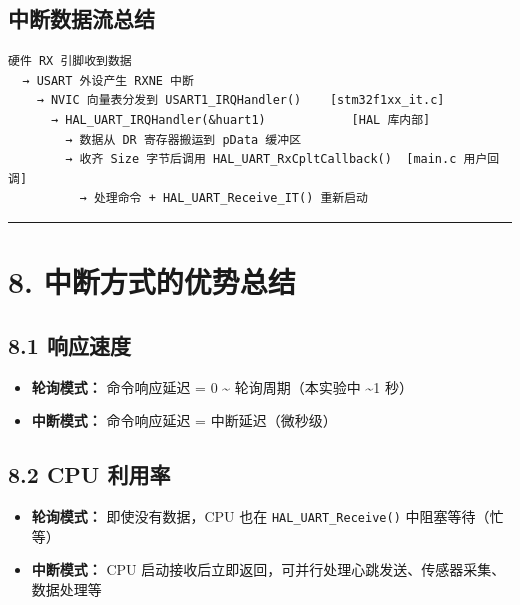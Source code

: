 \documentclass[
  chinese,
  UTF8,
  oneside,
  openany]{ctexbook}
\providecommand{\tightlist}{%
  \setlength{\itemsep}{0pt}\setlength{\parskip}{0pt}}
\begin{document}
\subsection{中断数据流总结}\label{ux4e2dux65adux6570ux636eux6d41ux603bux7ed3}

\begin{verbatim}
硬件 RX 引脚收到数据
  → USART 外设产生 RXNE 中断
    → NVIC 向量表分发到 USART1_IRQHandler()    [stm32f1xx_it.c]
      → HAL_UART_IRQHandler(&huart1)            [HAL 库内部]
        → 数据从 DR 寄存器搬运到 pData 缓冲区
        → 收齐 Size 字节后调用 HAL_UART_RxCpltCallback()  [main.c 用户回调]
          → 处理命令 + HAL_UART_Receive_IT() 重新启动
\end{verbatim}

\begin{center}\rule{0.5\linewidth}{0.5pt}\end{center}

\section{8.
中断方式的优势总结}\label{ux4e2dux65adux65b9ux5f0fux7684ux4f18ux52bfux603bux7ed3}

\subsection{8.1 响应速度}\label{ux54cdux5e94ux901fux5ea6}

\begin{itemize}
\tightlist
\item
  \textbf{轮询模式：} 命令响应延迟 = 0 \textasciitilde{}
  轮询周期（本实验中 \textasciitilde1 秒）
\item
  \textbf{中断模式：} 命令响应延迟 = 中断延迟（微秒级）
\end{itemize}

\subsection{8.2 CPU 利用率}\label{cpu-ux5229ux7528ux7387}

\begin{itemize}
\tightlist
\item
  \textbf{轮询模式：} 即使没有数据，CPU 也在
  \texttt{HAL\_UART\_Receive()} 中阻塞等待（忙等）
\item
  \textbf{中断模式：} CPU
  启动接收后立即返回，可并行处理心跳发送、传感器采集、数据处理等
\end{itemize}
\end{document}
